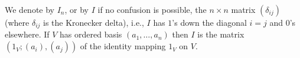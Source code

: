 We denote by $I_n$, or by $I$ if no confusion is possible, the $n \times n$ matrix $(\delta_{ij})$ (where $\delta_{ij}$ is the Kronecker delta), i.e., $I$ has $1$'s down the diagonal $i=j$ and $0$'s elsewhere. If $V$ has ordered basis $(a_1, \ldots, a_n)$ then $I$ is the matrix $(1_V; (a_i), (a_j))$ of the identity mapping $1_V$ on $V$.
